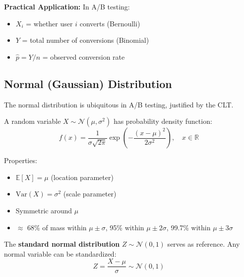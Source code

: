 \textbf{Practical Application:} In A/B testing:
\begin{itemize}
    \item $X_i$ = whether user $i$ converts (Bernoulli)
    \item $Y$ = total number of conversions (Binomial)
    \item $\hat{p} = Y/n$ = observed conversion rate
\end{itemize}

\subsection{Normal (Gaussian) Distribution}

The normal distribution is ubiquitous in A/B testing, justified by the CLT.

\begin{definition}
A random variable $X \sim \mathcal{N}(\mu, \sigma^2)$ has probability density function:
\begin{equation}
f(x) = \frac{1}{\sigma\sqrt{2\pi}} \exp\left(-\frac{(x-\mu)^2}{2\sigma^2}\right), \quad x \in \mathbb{R}
\end{equation}

Properties:
\begin{itemize}
    \item $\mathbb{E}[X] = \mu$ (location parameter)
    \item $\text{Var}(X) = \sigma^2$ (scale parameter)
    \item Symmetric around $\mu$
    \item $\approx$ 68\% of mass within $\mu \pm \sigma$, 95\% within $\mu \pm 2\sigma$, 99.7\% within $\mu \pm 3\sigma$
\end{itemize}
\end{definition}

The \textbf{standard normal distribution} $Z \sim \mathcal{N}(0, 1)$ serves as reference. Any normal variable can be standardized:
\begin{equation}
Z = \frac{X - \mu}{\sigma} \sim \mathcal{N}(0, 1)
\end{equation}

